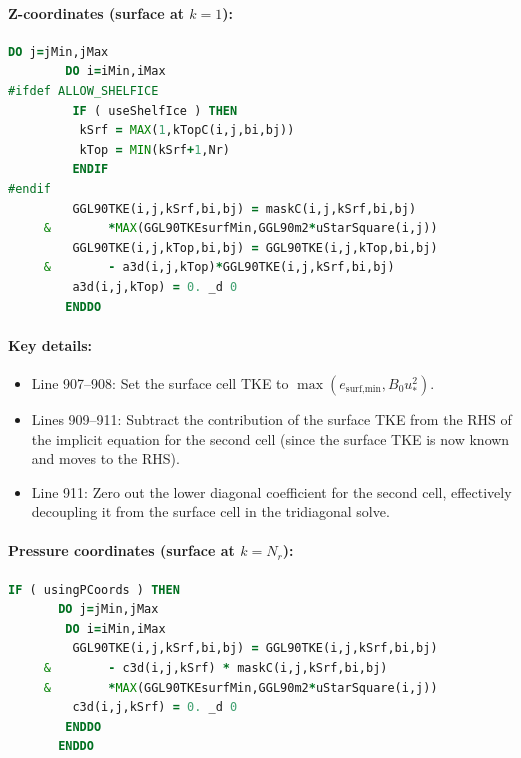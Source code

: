 \documentclass[12pt,letterpaper]{article}
\begin{document}
\paragraph{Z-coordinates (surface at $k=1$):}

\begin{lstlisting}[language=Fortran,caption={(ggl90\_calc.F:L899--912) Surface BC in z-coordinates}]
       DO j=jMin,jMax
        DO i=iMin,iMax
#ifdef ALLOW_SHELFICE
         IF ( useShelfIce ) THEN
          kSrf = MAX(1,kTopC(i,j,bi,bj))
          kTop = MIN(kSrf+1,Nr)
         ENDIF
#endif
         GGL90TKE(i,j,kSrf,bi,bj) = maskC(i,j,kSrf,bi,bj)
     &        *MAX(GGL90TKEsurfMin,GGL90m2*uStarSquare(i,j))
         GGL90TKE(i,j,kTop,bi,bj) = GGL90TKE(i,j,kTop,bi,bj)
     &        - a3d(i,j,kTop)*GGL90TKE(i,j,kSrf,bi,bj)
         a3d(i,j,kTop) = 0. _d 0
        ENDDO
\end{lstlisting}

\paragraph{Key details:}
\begin{itemize}
\item Line 907--908: Set the surface cell TKE to $\max(e_{\text{surf,min}}, B_0 u_*^2)$.
\item Lines 909--911: Subtract the contribution of the surface TKE from the RHS of the implicit equation for the second cell (since the surface TKE is now known and moves to the RHS).
\item Line 911: Zero out the lower diagonal coefficient for the second cell, effectively decoupling it from the surface cell in the tridiagonal solve.
\end{itemize}

\paragraph{Pressure coordinates (surface at $k=N_r$):}

\begin{lstlisting}[language=Fortran,caption={(ggl90\_calc.F:L883--897) Surface BC in pressure coordinates}]
      IF ( usingPCoords ) THEN
       DO j=jMin,jMax
        DO i=iMin,iMax
         GGL90TKE(i,j,kSrf,bi,bj) = GGL90TKE(i,j,kSrf,bi,bj)
     &        - c3d(i,j,kSrf) * maskC(i,j,kSrf,bi,bj)
     &        *MAX(GGL90TKEsurfMin,GGL90m2*uStarSquare(i,j))
         c3d(i,j,kSrf) = 0. _d 0
        ENDDO
       ENDDO
\end{lstlisting}
\end{document}

